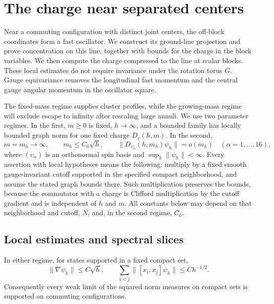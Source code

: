 \section{The charge near separated centers}
\label{fast:section}

Near a commuting configuration with distinct joint centers, the off-block
coordinates form a fast oscillator. We construct its ground-line
projection and prove concentration on this line, together with bounds
for the charge in the block variables. We then
compute the charge compressed to the line at scalar blocks. These local
estimates do not require invariance under the rotation torus $G$.
Gauge equivariance removes the longitudinal fast momentum and the
central gauge angular momentum in the oscillator square.

The fixed-mass regime supplies cluster profiles, while the growing-mass
regime will exclude escape to infinity after rescaling large annuli.
We use two parameter regimes. In the first, $m\geq0$ is fixed, $h\to\infty$,
and a bounded family has locally bounded graph norm for one fixed charge
$D_v(h,m)$. In the second,
\begin{equation}
 m=m_h\longrightarrow\infty,\qquad m_h\leq C_0\sqrt h,
 \qquad \|D_{v_\alpha}(h,m_h)\psi_h\|=o(m_h)
 \quad(\alpha=1,\ldots,16),
 \label{fast:growing-mass}
\end{equation}
where $(v_\alpha)$ is an orthonormal spin basis and
$\sup_h\|\psi_h\|<\infty$. Every assertion with local hypotheses means the
following: multiply by a fixed smooth gauge-invariant cutoff supported in
the specified compact neighborhood, and assume the stated graph bounds
there. Such multiplication preserves the bounds, because the commutator
with a charge is Clifford multiplication by the cutoff gradient and is
independent of $h$ and $m$. All constants below may depend on that
neighborhood and cutoff, $N$, and, in the second regime, $C_0$.

\subsection{Local estimates and spectral slices}

\begin{lemma}\label{lem:raw-estimates}
In either regime, for states supported in a fixed compact set,
\begin{equation}
 \|\nabla\psi_h\|\leq C\sqrt h,
 \qquad
 \sum_{i<j}\|[x_i,x_j]\psi_h\|\leq C h^{-1/2}.
 \label{eq:raw-estimates}
\end{equation}
Consequently every weak limit of the squared norm measures on compact
sets is supported on commuting configurations.
\end{lemma}

